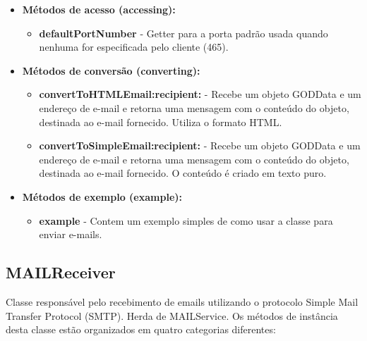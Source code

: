 \begin{itemize}
	\item \textbf{Métodos de acesso (accessing):}
	\begin{itemize}
		\item \textbf{defaultPortNumber} - Getter para a porta padrão usada quando nenhuma for especificada pelo cliente (465).
	\end{itemize}
	\item \textbf{Métodos de conversão (converting):}
	\begin{itemize} 
		\item \textbf{convertToHTMLEmail:recipient:} - Recebe um objeto GODData e um endereço de e-mail e retorna uma mensagem com o conteúdo do objeto, destinada ao e-mail fornecido. Utiliza o formato HTML.
		\item \textbf{convertToSimpleEmail:recipient:} - Recebe um objeto GODData e um endereço de e-mail e retorna uma mensagem com o conteúdo do objeto, destinada ao e-mail fornecido. O conteúdo é criado em texto puro.
	\end{itemize}
	\item \textbf{Métodos de exemplo (example):}
	\begin{itemize}
		\item \textbf{example} - Contem um exemplo simples de como usar a classe para enviar e-mails.
	\end{itemize}
\end{itemize}

\subsection{MAILReceiver}

Classe responsável pelo recebimento de emails utilizando o protocolo Simple Mail Transfer Protocol (SMTP). Herda de MAILService. Os métodos de instância desta classe estão organizados em quatro categorias diferentes:

